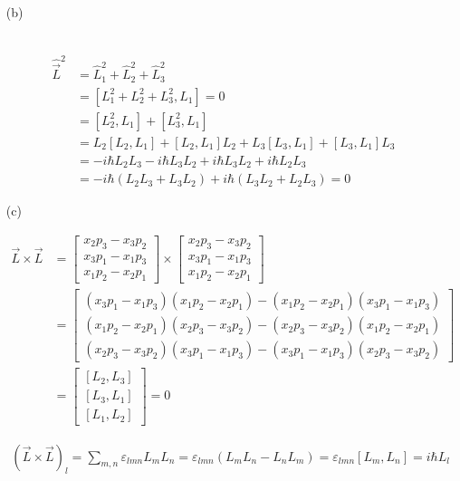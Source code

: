 \documentclass[11pt,a4paper]{article}
\begin{document}
\begin{enumerate}
\item[(b)]

\begin{align*}
[\hat{\vec{L}}_1^2,\hat{L}_1]
\end{align*}

\begin{align*}
\hat{\vec{L}}^2&=\hat{L}_1^2+\hat{L}_2^2+\hat{L}_3^2\\
&=[L_1^2+L_2^2+L_3^2,L_1]=0\\
&=[L_2^2,L_1]+[L_3^2,L_1]\\
&=L_2[L_2,L_1]+[L_2,L_1]L_2+L_3[L_3,L_1]+[L_3,L_1]L_3\\
&=-i\hbar L_2L_3-i\hbar L_3L_2+i\hbar L_3L_2+i\hbar L_2L_3\\
&=-i\hbar(L_2L_3+L_3L_2)+i\hbar(L_3L_2+L_2L_3)=0
\end{align*}

\end{enumerate}

\newpage

\begin{enumerate}
\item[(c)]

\begin{align*}
\vec{L}\times\vec{L}&=
\begin{bmatrix}
x_2p_3-x_3p_2 \\
x_3p_1-x_1p_3 \\
x_1p_2-x_2p_1
\end{bmatrix}
\times
\begin{bmatrix}
x_2p_3-x_3p_2 \\
x_3p_1-x_1p_3 \\
x_1p_2-x_2p_1
\end{bmatrix}\\&=
\begin{bmatrix}
(x_3p_1-x_1p_3)(x_1p_2-x_2p_1)-(x_1p_2-x_2p_1)(x_3p_1-x_1p_3)\\
(x_1p_2-x_2p_1)(x_2p_3-x_3p_2)-(x_2p_3-x_3p_2)(x_1p_2-x_2p_1)\\
(x_2p_3-x_3p_2)(x_3p_1-x_1p_3)-(x_3p_1-x_1p_3)(x_2p_3-x_3p_2)
\end{bmatrix}\\&=
\begin{bmatrix}
[L_2,L_3] \\
[L_3,L_1] \\
[L_1,L_2]
\end{bmatrix}=0
\end{align*}

\begin{align*}
(\vec{L}\times\vec{L})_l=\sum_{m,n}\varepsilon_{lmn}L_mL_n=\varepsilon_{lmn}(L_mL_n-L_nL_m)=\varepsilon_{lmn}[L_m,L_n]=i\hbar L_l
\end{align*}

\end{enumerate}
\end{document}
